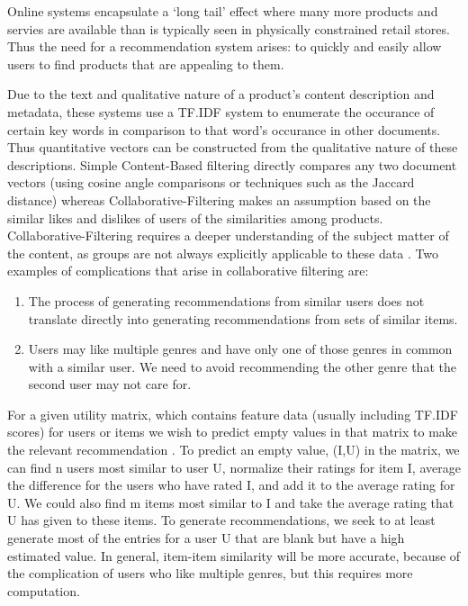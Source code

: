 \documentclass[11pt]{article}
\begin{document}
Online systems encapsulate a `long tail' effect \cite{chapter9} where many more products and servies are available than is typically seen in physically constrained retail stores. Thus the need for a recommendation system arises: to quickly and easily allow users to find products that are appealing to them.\\
\par Due to the text and qualitative nature of a product's content description and metadata, these systems use a TF.IDF \cite{beginners_guide} system to enumerate the occurance of certain key words in comparison to that word's occurance in other documents. Thus quantitative vectors can be constructed from the qualitative nature of these descriptions. Simple Content-Based filtering directly compares any two document vectors (using cosine angle comparisons or techniques such as the Jaccard distance) \cite{chapter9} whereas Collaborative-Filtering makes an assumption based on the similar likes and dislikes of users of the similarities among products. Collaborative-Filtering requires a deeper understanding of the subject matter of the content, as groups are not always explicitly applicable to these data \cite{chapter9}. Two examples of complications that arise in collaborative filtering are:
\begin{enumerate}
		\item The process of generating recommendations from similar users does not translate directly into generating recommendations from sets of similar items.
		\item Users may like multiple genres and have only one of those genres in common with a similar user. We need to avoid recommending the other genre that the second user may not care for.
\end{enumerate}
\par For a given utility matrix, which contains feature data (usually including TF.IDF scores) for users or items we wish to predict empty values in that matrix to make the relevant recommendation \cite{chapter9}. To predict an empty value, (I,U) in the matrix, we can find n users most similar to user U, normalize their ratings for item I, average the difference for the users who have rated I, and add it to the average rating for U. We could also find m items most similar to I and take the average rating that U has given to these items. To generate recommendations, we seek to at least generate most of the entries for a user U that are blank but have a high estimated value. In general, item-item similarity will be more accurate, because of the complication of users who like multiple genres, but this requires more computation.\\
\end{document}
